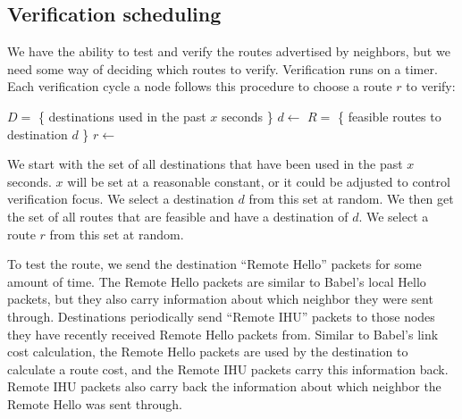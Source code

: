 \documentclass[11pt]{article}
\newlength{\currentparskip}
\newenvironment{unbreakable}
  {\setlength{\currentparskip}{\parskip}%
	 \vspace{\currentparskip}
   \begin{minipage}{\textwidth}%
   \setlength{\parskip}{\currentparskip}%
  }
  {\end{minipage}\vspace{\currentparskip}}
\begin{document}
\subsection{Verification scheduling}
\begin{unbreakable}
We have the ability to test and verify the routes advertised by neighbors, but we need some way of deciding which routes to verify. Verification runs on a timer. Each verification cycle a node follows this procedure to choose a route $r$ to verify:

\vspace{\abovedisplayskip}
\begin{algorithmic}
\State $D=$ \{ destinations used in the past $x$ seconds \}
\State $d\gets$ 
\State $R=$ \{ feasible routes to destination $d$ \}
\State $r\gets$ 
\end{algorithmic}
\vspace{\belowdisplayskip}

We start with the set of all destinations that have been used in the past $x$ seconds. $x$ will be set at a reasonable constant, or it could be adjusted to control verification focus. We select a destination $d$ from this set at random. We then get the set of all routes that are feasible and have a destination of $d$. We select a route $r$ from this set at random.
\end{unbreakable}

To test the route, we send the destination ``Remote Hello'' packets for some amount of time. The Remote Hello packets are similar to Babel’s local Hello packets, but they also carry information about which neighbor they were sent through. Destinations periodically send ``Remote IHU'' packets to those nodes they have recently received Remote Hello packets from. Similar to Babel’s link cost calculation, the Remote Hello packets are used by the destination to calculate a route cost, and the Remote IHU packets carry this information back. Remote IHU packets also carry back the information about which neighbor the Remote Hello was sent through.
\end{document}

